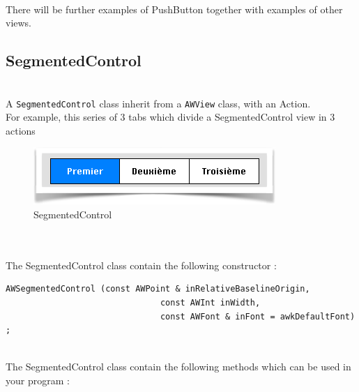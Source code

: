 \documentclass[a4paper,11pt]{extarticle}
\begin{document}
~\\There will be further examples of PushButton together with examples of other views.

\newpage
\subsection{SegmentedControl}

~\\ A \texttt{SegmentedControl} class inherit from a \texttt{AWView} class, with an Action.
~\\ For example, this series of 3 tabs which divide a SegmentedControl view in 3 actions
~\\

\begin{figure}[htbp]
   \centering
   \includegraphics[scale=0.7]{AWFig11.png} 
   \caption{SegmentedControl}
   \label{fig:11}
\end{figure}

~\\

~\\ The SegmentedControl class contain the following constructor :

\begin{lstlisting}[language=Arduinonl]
  AWSegmentedControl (const AWPoint & inRelativeBaselineOrigin,
                               const AWInt inWidth,
                               const AWFont & inFont = awkDefaultFont) ;
\end{lstlisting}

~\\ The SegmentedControl class contain the following methods which can be used in your program :
\end{document}
